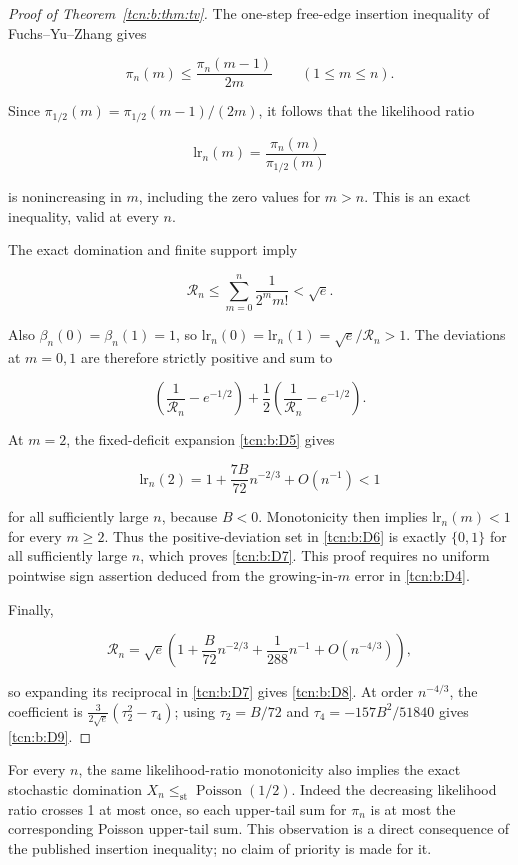 \documentclass[11pt,letterpaper]{article}
\theoremstyle{remark}
\begin{document}
\begin{proof}[Proof of Theorem~\ref{tcn:b:thm:tv}] The one-step free-edge insertion inequality of
Fuchs--Yu--Zhang \cite[Lemma 2]{FYZ2021} gives

\[
 \pi_n(m)\le\frac{\pi_n(m-1)}{2m}\qquad(1\le m\le n).
\]

Since \(\pi_{1/2}(m)=\pi_{1/2}(m-1)/(2m)\), it follows that the likelihood ratio

\[
 \mathrm{lr}_n(m)=\frac{\pi_n(m)}{\pi_{1/2}(m)}
\]

is nonincreasing in \(m\), including the zero values for \(m>n\). This
is an exact inequality, valid at every \(n\).

The exact domination and finite support imply

\[
 \mathcal R_n\le\sum_{m=0}^n\frac1{2^m m!}<\sqrt e.
\]

Also \(\beta_n(0)=\beta_n(1)=1\), so \(\mathrm{lr}_n(0)=\mathrm{lr}_n(1)=\sqrt e/\mathcal R_n>1\). The
deviations at \(m=0,1\) are therefore strictly positive and sum to

\[
 \left(\frac1{\mathcal R_n}-e^{-1/2}\right)
 +\frac12\left(\frac1{\mathcal R_n}-e^{-1/2}\right).                   \tag{D10}\label{tcn:b:D10}
\]

At \(m=2\), the fixed-deficit expansion \eqref{tcn:b:D5} gives

\[
 \mathrm{lr}_n(2)=1+\frac{7B}{72}n^{-2/3}+O(n^{-1})<1               \tag{D11}\label{tcn:b:D11}
\]

for all sufficiently large \(n\), because \(B<0\). Monotonicity then
implies \(\mathrm{lr}_n(m)<1\) for every \(m\ge2\). Thus the positive-deviation
set in \eqref{tcn:b:D6} is exactly \(\{0,1\}\) for all sufficiently large \(n\),
which proves \eqref{tcn:b:D7}. This proof requires no uniform pointwise sign
assertion deduced from the growing-in-\(m\) error in \eqref{tcn:b:D4}.

Finally,

\[
 \mathcal R_n=\sqrt e\left(1+\frac B{72}n^{-2/3}
                         +\frac1{288}n^{-1}+O(n^{-4/3})\right),
\]

so expanding its reciprocal in \eqref{tcn:b:D7} gives \eqref{tcn:b:D8}. At order \(n^{-4/3}\),
the coefficient is \(\frac{3}{2\sqrt e}(\tau_2^2-\tau_4)\); using \(\tau_2=B/72\)
and \(\tau_4=-157B^2/51840\) gives \eqref{tcn:b:D9}.
\end{proof}

For every \(n\), the same likelihood-ratio monotonicity also implies the
exact stochastic domination
\(X_n\le_{\mathrm{st}}\operatorname{Poisson}(1/2)\). Indeed the
decreasing likelihood ratio crosses 1 at most once, so each upper-tail
sum for \(\pi_n\) is at most the corresponding Poisson upper-tail sum.
This observation is a direct consequence of the published insertion
inequality; no claim of priority is made for it.
\end{document}
